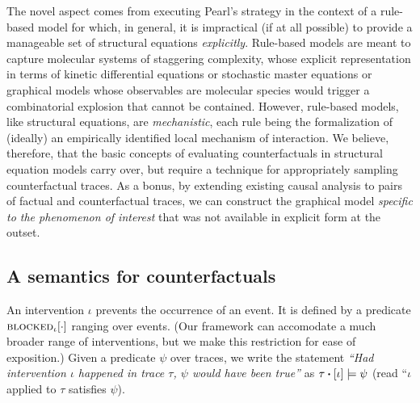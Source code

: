 The novel aspect comes from executing Pearl's strategy in the context of a rule-based model for which, in general, it is impractical (if at all possible) to provide a manageable set of structural equations \emph{explicitly}. Rule-based models are meant to capture molecular systems of staggering complexity, whose explicit representation in terms of kinetic differential equations or stochastic master equations or graphical models whose observables are molecular species would trigger a combinatorial explosion that cannot be contained. However, rule-based models, like structural equations, are \emph{mechanistic}, each rule being the formalization of (ideally) an empirically identified local mechanism of interaction. We believe, therefore, that the basic concepts of evaluating counterfactuals in structural equation models carry over, but require a technique for appropriately sampling counterfactual traces. As a bonus, by extending existing causal analysis to pairs of factual and counterfactual traces, we can construct the graphical model \emph{specific to the phenomenon of interest} that was not available in explicit form at the outset.

\subsection{A semantics for counterfactuals}
\label{sec:counterfactuals-semantics}

An intervention $\iota$ prevents the occurrence of an event. It is defined by a predicate ${\textsc{blocked}}_{\iota}[\cdot]$ ranging over events. (Our framework can accomodate a much broader range of interventions, but we make this restriction for ease of exposition.)  Given a predicate $\psi$ over traces, we write the statement \textit{``Had intervention $\iota$ happened in trace $\tau$, $\psi$ would have been true''} as $\UPDATE{\tau}{[\iota]} \models \psi$ (read ``$\iota$ applied to $\tau$ satisfies $\psi$).

